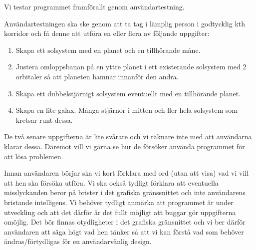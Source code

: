 
Vi testar programmet framförallt genom användartestning.

Användartestningen ska ske genom att ta tag i lämplig person
i godtycklig kth korridor och få denne att utföra en eller flera
av följande uppgifter:
\begin{enumerate}
    \item Skapa ett solsystem med en planet och en tillhörande måne.
    \item Justera omloppsbanan på en yttre planet i ett existerande
        solsystem med 2 orbitaler så att planeten hamnar innanför den andra.
    \item Skapa ett dubbelstjärnigt solsystem eventuellt med
        en tillhörande planet.
    \item Skapa en lite galax.
        Många stjärnor i mitten och fler hela solsystem som kretsar runt dessa.
\end{enumerate}
De två senare uppgifterna är lite svårare och vi räknare inte med
att användarna klarar dessa. Däremot vill vi gärna se hur de försöker använda
programmet för att lösa problemen.

Innan användaren börjar ska vi kort förklara med ord (utan att visa)
vad vi vill att hen ska försöka utföra.
Vi ska också tydligt förklara att eventuella misslyckanden
beror på brister i det grafiska gränssnittet och
inte användarens bristande intelligens.
Vi behöver tydligt anmärka att programmet är under utveckling och
att det därför är det fullt möjligt att buggar gör uppgifterna omöjlig.
Det bör finnas otydligheter i det grafiska gränsnittet och vi ber därför
användaren att säga högt vad hen tänker så att vi kan förstå vad som
behöver ändras/förtydligas för en användarvänlig design.

